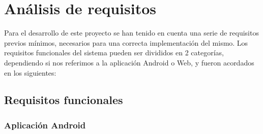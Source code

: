 \label{chp:Impl}

\section{Análisis de requisitos}
\label{sec:Requirements}

Para el desarrollo de este proyecto se han tenido en cuenta una serie de requisitos previos mínimos, necesarios para una correcta implementación del mismo. Los requisitos funcionales del sistema pueden ser divididos en 2 categorías, dependiendo si nos referimos a la aplicación Android o Web, y fueron acordados en los siguientes:

\subsection{Requisitos funcionales}

\subsubsection{Aplicación Android}

